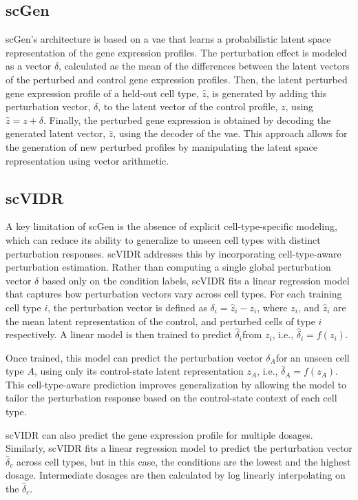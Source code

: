 \documentclass[12pt, a4paper]{article}
\begin{document}
\subsection{scGen}

scGen's architecture is based on a \gls{vae} that learns a probabilistic latent space representation of the gene expression profiles. 
The perturbation effect is modeled as a vector $\delta$, calculated as the mean of the differences between the latent vectors of the perturbed and control gene expression profiles. Then, the latent perturbed gene expression profile of a held-out cell type, $\hat{z}$,  is generated by adding this perturbation vector, $\delta$, to the latent vector of the control profile, $z$, using $\hat{z} = z + \delta$. Finally, the perturbed gene expression is obtained by decoding the generated latent vector, $\hat{z}$, using the decoder of the \gls{vae}. This approach allows for the generation of new perturbed profiles by manipulating the latent space representation using vector arithmetic.

\subsection{scVIDR}
 

A key limitation of scGen is the absence of explicit cell-type-specific modeling, which can reduce its ability to generalize to unseen cell types with distinct perturbation responses.
scVIDR addresses this by incorporating cell-type-aware perturbation estimation. Rather than computing a single global perturbation vector $\delta$ based only on the condition labels, scVIDR fits a linear regression model that captures how perturbation vectors vary across cell types.
For each training cell type $i$, the perturbation vector is defined as $\delta_i = \hat{z}_i - z_i$,
where $z_i$​, and $\hat{z}_i$ are the mean latent representation of the control, and perturbed cells of type $i$ respectively.
A linear model is then trained to predict $\hat{\delta}_i$​ from $z_i$, i.e., $\hat{\delta}_i = f(z_i)$.


Once trained, this model can predict the perturbation vector $\delta_A$​ for an unseen cell type $A$, using only its control-state latent representation $z_A$, i.e., $\hat{\delta}_A = f(z_A)$.
This cell-type-aware prediction improves generalization by allowing the model to tailor the perturbation response based on the control-state context of each cell type.

scVIDR can also predict the gene expression profile for multiple dosages. Similarly, scVIDR fits a linear regression model to predict the perturbation vector $\hat{\delta}_c$ across cell types, but in this case, the conditions are the lowest and the highest dosage. Intermediate dosages are then calculated by log linearly interpolating on the $\hat{\delta}_c$.
\end{document}
